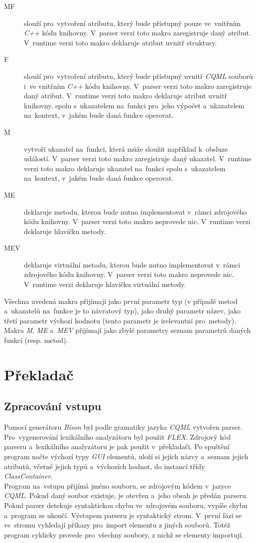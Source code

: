 \documentclass[11pt,twoside,a4paper]{book}
\begin{document}
\begin{description}
\item[MF] slouží pro~vytvoření atributu, který bude přístupný pouze ve~vnitřním \textit{C++} kódu knihovny. V~parser verzi toto makro zaregistruje daný atribut. V~runtime verzi toto makro deklaruje atribut uvnitř struktury.
\item[F] slouží pro~vytvoření atributu, který bude přístupný uvnitř \textit{CQML} souborů i~ve vnitřním \textit{C++} kódu knihovny. V~parser verzi toto makro zaregistruje daný atribut. V~runtime verzi toto makro deklaruje atribut uvnitř knihovny, spolu s~ukazatelem na~funkci pro~jeho výpočet a~ukazatelem na~kontext, v~jakém bude daná funkce  operovat.
\item[M] vytvoří ukazatel na~funkci, která může sloužit například k~obsluze událostí. V~parser verzi toto makro zaregistruje daný ukazatel. V~runtime verzi toto makro deklaruje ukazatel na~funkci spolu s~ukazatelem na~kontext, v~jakém bude daná funkce operovat. 
\item[ME] deklaruje metodu, kterou bude nutno implementovat v~rámci zdrojového kódu knihovny. V~parser verzi toto makro neprovede nic. V~runtime verzi deklaruje hlavičku metody.
\item[MEV] deklaruje virtuální metodu, kterou bude nutno implementovat v~rámci zdrojového kódu knihovny. V~parser verzi toto makro neprovede nic. V~runtime verzi deklaruje hlavičku virtuální metody.
\end{description}
Všechna uvedená makra přijímají jako první parametr typ (v případě metod a~ukazatelů na~funkce je to návratový typ), jako druhý parametr název, jako třetí parametr výchozí hodnotu (tento parametr je irelevantní pro~metody). Makra \textit{M}, \textit{ME} a~\textit{MEV} přijímají jako zbylé parametry seznam parametrů daných funkcí (resp. metod).\\



\section{\label{SEC:transImpl}Překladač}
\subsection{Zpracování vstupu}
Pomocí generátoru \textit{Bison} byl podle gramatiky jazyka \textit{CQML} vytvořen parser. Pro~vygenerování lexikálního analyzátoru byl použit \textit{FLEX}. Zdrojový kód parseru a~lexikálního analyzátoru je pak použit v~překladači.
Po spuštění program načte výchozí typy \textit{GUI} elementů, uloží si jejich názvy a~seznam jejich atributů, včetně jejich typů a~výchozích hodnot, do instancí třídy \textit{ClassContainer}.\\
Program na~vstupu přijímá jméno souboru, se zdrojovým kódem v~jazyce \textit{CQML}. Pokud daný soubor existuje, je otevřen a~jeho obsah je předán parseru. Pokud parser detekuje syntaktickou chybu ve~zdrojovém souboru, vypíše chybu a~program se ukončí. Výstupem parseru je syntaktický strom. V~první fázi se ve~stromu vyhledají příkazy pro~import elementu z jiných souborů. Totéž program cyklicky provede pro~všechny soubory, z nichž se elementy importují.
\end{document}
